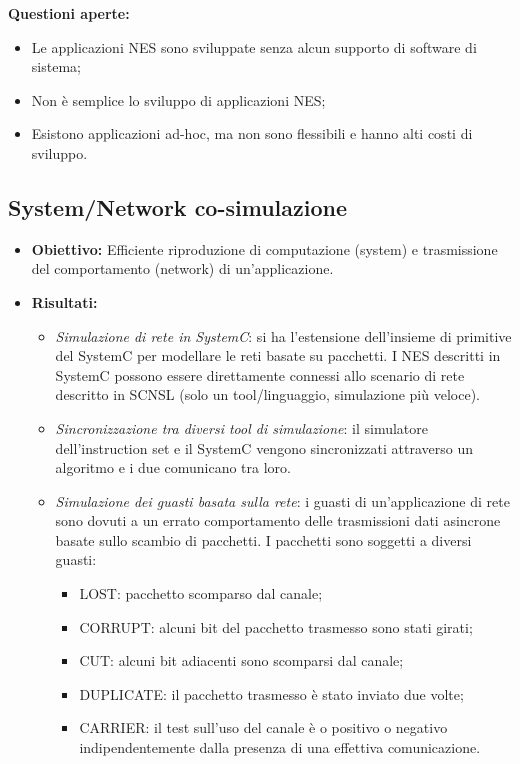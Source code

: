 \documentclass[a4paper]{article}
\theoremstyle{definition}
\begin{document}
	 	\noindent
	 	\textbf{Questioni aperte:}
	 	\begin{itemize}
	 		\item Le applicazioni NES sono sviluppate senza alcun supporto di software di sistema;
	 		\item Non è semplice lo sviluppo di applicazioni NES;
	 		\item Esistono applicazioni ad-hoc, ma non sono flessibili e hanno alti costi di sviluppo.
	 	\end{itemize}
	
		\subsection{System/Network co-simulazione}
			\begin{itemize}
				\item \textbf{Obiettivo:} Efficiente riproduzione di computazione (system) e trasmissione del comportamento (network) di un'applicazione.
				\item \textbf{Risultati:} 
				\begin{itemize}
					\item \textit{Simulazione di rete in SystemC}: si ha l'estensione dell'insieme di primitive del SystemC per modellare le reti basate su pacchetti. I NES descritti in SystemC possono essere direttamente connessi allo scenario di rete descritto in SCNSL (solo un tool/linguaggio, simulazione più veloce).
					\item \textit{Sincronizzazione tra diversi tool di simulazione}: il simulatore dell'instruction set e il SystemC vengono sincronizzati attraverso un algoritmo e i due comunicano tra loro.
					\item \textit{Simulazione dei guasti basata sulla rete}: i guasti di un'applicazione di rete sono dovuti a un errato comportamento delle trasmissioni dati asincrone basate sullo scambio di pacchetti. I pacchetti sono soggetti a diversi guasti:
					\begin{multicols}{2}
						\begin{itemize}
							\item LOST: pacchetto scomparso dal canale;
							\item CORRUPT: alcuni bit del pacchetto trasmesso sono stati girati;
							\item CUT: alcuni bit adiacenti sono scomparsi dal canale;
							\item DUPLICATE: il pacchetto trasmesso è stato inviato due volte;
							\item CARRIER: il test sull'uso del canale è o positivo o negativo indipendentemente dalla presenza di una effettiva comunicazione.
						\end{itemize}
					\end{multicols}
				\end{itemize}
			\end{itemize}
			
\end{document}
